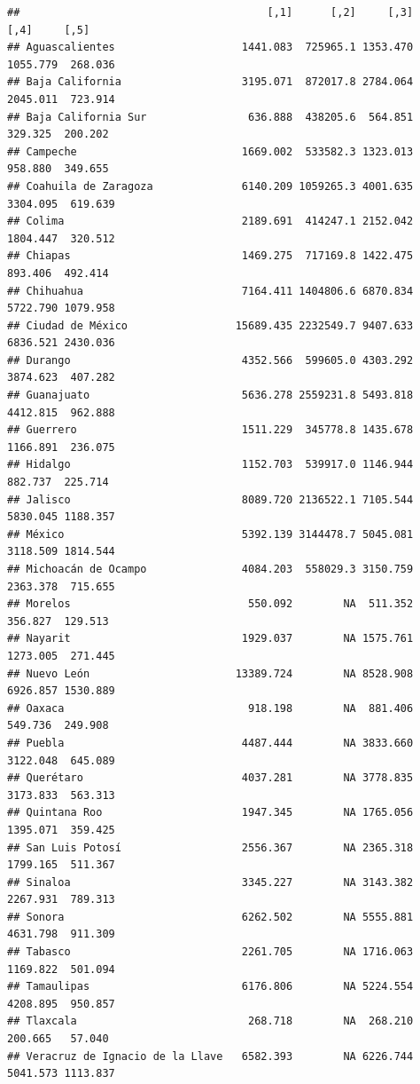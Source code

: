 \documentclass[
]{article}
\begin{document}
\begin{verbatim}
##                                       [,1]      [,2]     [,3]     [,4]     [,5]
## Aguascalientes                    1441.083  725965.1 1353.470 1055.779  268.036
## Baja California                   3195.071  872017.8 2784.064 2045.011  723.914
## Baja California Sur                636.888  438205.6  564.851  329.325  200.202
## Campeche                          1669.002  533582.3 1323.013  958.880  349.655
## Coahuila de Zaragoza              6140.209 1059265.3 4001.635 3304.095  619.639
## Colima                            2189.691  414247.1 2152.042 1804.447  320.512
## Chiapas                           1469.275  717169.8 1422.475  893.406  492.414
## Chihuahua                         7164.411 1404806.6 6870.834 5722.790 1079.958
## Ciudad de México                 15689.435 2232549.7 9407.633 6836.521 2430.036
## Durango                           4352.566  599605.0 4303.292 3874.623  407.282
## Guanajuato                        5636.278 2559231.8 5493.818 4412.815  962.888
## Guerrero                          1511.229  345778.8 1435.678 1166.891  236.075
## Hidalgo                           1152.703  539917.0 1146.944  882.737  225.714
## Jalisco                           8089.720 2136522.1 7105.544 5830.045 1188.357
## México                            5392.139 3144478.7 5045.081 3118.509 1814.544
## Michoacán de Ocampo               4084.203  558029.3 3150.759 2363.378  715.655
## Morelos                            550.092        NA  511.352  356.827  129.513
## Nayarit                           1929.037        NA 1575.761 1273.005  271.445
## Nuevo León                       13389.724        NA 8528.908 6926.857 1530.889
## Oaxaca                             918.198        NA  881.406  549.736  249.908
## Puebla                            4487.444        NA 3833.660 3122.048  645.089
## Querétaro                         4037.281        NA 3778.835 3173.833  563.313
## Quintana Roo                      1947.345        NA 1765.056 1395.071  359.425
## San Luis Potosí                   2556.367        NA 2365.318 1799.165  511.367
## Sinaloa                           3345.227        NA 3143.382 2267.931  789.313
## Sonora                            6262.502        NA 5555.881 4631.798  911.309
## Tabasco                           2261.705        NA 1716.063 1169.822  501.094
## Tamaulipas                        6176.806        NA 5224.554 4208.895  950.857
## Tlaxcala                           268.718        NA  268.210  200.665   57.040
## Veracruz de Ignacio de la Llave   6582.393        NA 6226.744 5041.573 1113.837

\end{verbatim}
\end{document}
